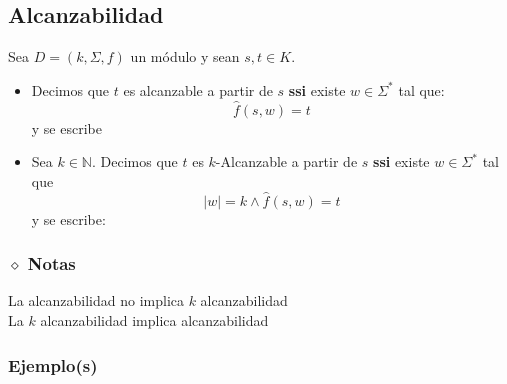 \subsection{Alcanzabilidad}
Sea $D =(k,\Sigma,f)$ un módulo y sean $s,t\in K$.
\begin{itemize}
\item Decimos que $t$ es alcanzable a partir de $s$ \textbf{ssi} existe $w\in\Sigma^*$ tal que:
$$
	\hat{f}(s,w)=t
$$
y se escribe 

\begin{center}
\end{center}
\item Sea $k\in\mathbb{N}$. Decimos que $t$ es $k$-Alcanzable a partir de $s$ \textbf{ssi} existe $w\in\Sigma^*$ tal que $$|w|=k \wedge \hat{f}(s,w)=t$$  y se escribe:
\begin{center}
\end{center}

\end{itemize}
\subsubsection*{$\diamond$ Notas}\noindent
La alcanzabilidad no implica $k$ alcanzabilidad \\ 
La $k$ alcanzabilidad implica alcanzabilidad

\subsubsection{Ejemplo(s)}

